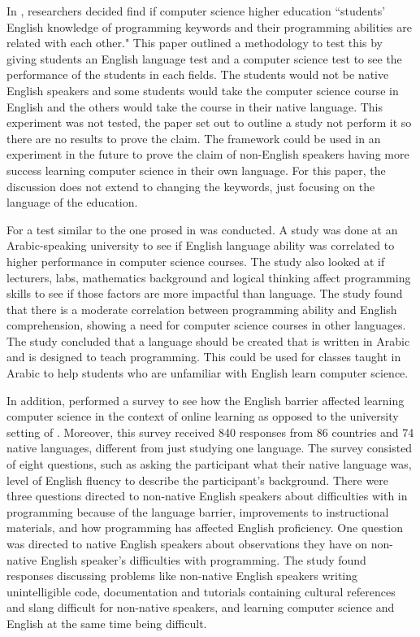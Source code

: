 \documentclass[10pt,twocolumn]{article}
\begin{document}
 In \textcite{Veerasamy2014Teaching}, researchers decided find if computer science higher education ``students’ English knowledge of programming keywords and their programming abilities are related with each other." This paper outlined a methodology to test this by giving students an English language test and a computer science test to see the performance of the students in each fields. The students would not be native English speakers and some students would take the computer science course in English and the others would take the course in their native language. This experiment was not tested, the paper set out to outline a study not perform it so there are no results to prove the claim. The framework could be used in an experiment in the future to prove the claim of non-English speakers having more success learning computer science in their own language. For this paper, the discussion does not extend to changing the keywords, just focusing on the language of the education.

For \textcite{Idris2018Correlation} a test similar to the one prosed in \textcite{Veerasamy2014Teaching} was conducted. A study was done at an Arabic-speaking university to see if English language ability was correlated to higher performance in computer science courses. The study also looked at if lecturers, labs, mathematics background and logical thinking affect programming skills to see if those factors are more impactful than language. The study found that there is a moderate correlation between programming ability and English comprehension, showing a need for computer science courses in other languages. The study concluded that a language should be created that is written in Arabic and is designed to teach programming. This could be used for classes taught in Arabic to help students who are unfamiliar with English learn computer science.

In addition, \textcite{Guo2018Non} performed a survey to see how the English barrier affected learning computer science in the context of online learning as opposed to the university setting of \textcite{Idris2018Correlation}. Moreover, this survey received 840 responses from 86 countries and 74 native languages, different from just studying one language. The survey consisted of eight questions, such as asking the participant what their native language was, level of English fluency to describe the participant's background. There were three questions directed to non-native English speakers about difficulties with in programming because of the language barrier, improvements to instructional materials, and how programming has affected English proficiency. One question was directed to native English speakers about observations they have on non-native English speaker's difficulties with programming. The study found responses discussing problems like non-native English speakers writing unintelligible code, documentation and tutorials containing cultural references and slang difficult for non-native speakers, and learning computer science and English at the same time being difficult.
\end{document}
